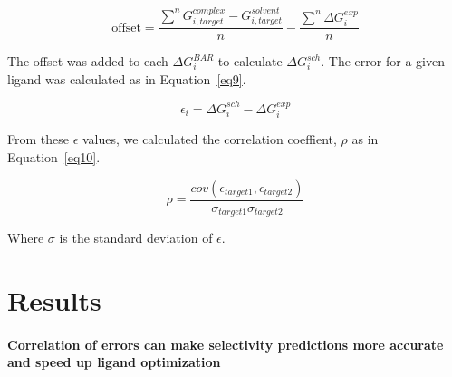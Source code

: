 \documentclass[9pt,lineno]{elife-modified} %
\begin{document}
\begin{equation}\label{eq8}
\text{offset} =  \frac{\sum^n G^{complex}_{i,target} - G^{solvent}_{i,target}}{n} - \frac{\sum^n \Delta G^{exp}_{i}}{n}
\end{equation}

The offset was added to each $\Delta G^{BAR}_{i}$ to calculate $\Delta G^{sch}_{i}$. The error for a given ligand was calculated as in Equation~\ref{eq9}. 

\begin{equation}\label{eq9}
\epsilon_i = \Delta G^{sch}_i - \Delta G^{exp}_i
\end{equation}

From these $\epsilon$ values, we calculated the correlation coeffient, $\rho$ as in Equation~\ref{eq10}. 

\begin{equation}\label{eq10}
\rho = \frac{cov(\epsilon_{target1}, \epsilon_{target2})}{\sigma_{target 1}\sigma_{target 2}}
\end{equation}
 
 Where $\sigma$ is the standard deviation of $\epsilon$. 
 
%
%
%

\section{Results}

\paragraph{Correlation of errors can make selectivity predictions more accurate and speed up ligand optimization}
\end{document}

